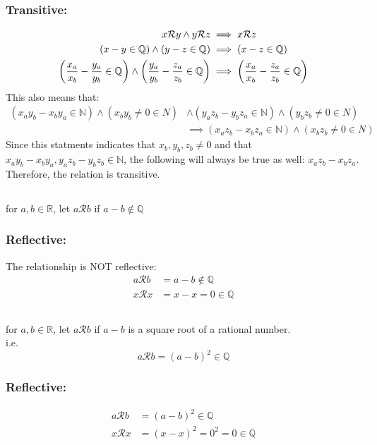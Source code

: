 \documentclass[]{article}
\newcommand{\Rel}{\mathcal{R}}
\newcommand{\R}{\mathbb{R}}
\newcommand{\N}{\mathbb{N}}
\newcommand{\Q}{\mathbb{Q}}
\begin{document}
\subsubsection{Transitive:}
\begin{align*}
	x \Rel y \land y \Rel z 
		&\implies x \Rel z\\
		\qty(x - y \in \Q) \land \qty(y - z \in \Q)
		&\implies \qty(x - z \in \Q)\\
	\qty(\frac{x_a}{x_b} - \frac{y_a}{y_b} \in \Q) \land \qty(\frac{y_a}{y_b} - \frac{z_a}{z_b} \in \Q)
		&\implies \qty(\frac{x_a}{x_b} - \frac{z_a}{z_b} \in \Q)
\end{align*}
This also means that:
\begin{align*}
	(x_a y_b - x_b y_a \in \N) \land (x_b y_b \neq 0 \in N)
		&\land (y_a z_b - y_b z_a \in \N) \land (y_b z_b \neq 0 \in N)\\
		&\implies (x_a z_b - x_b z_a \in \N) \land (x_b z_b \neq 0 \in N)
\end{align*}
Since this statments indicates that $x_b, y_b, z_b \neq 0$
and that $x_a y_b - x_b y_a, y_a z_b - y_b z_b \in \N$,
the following will always be true as well: $x_a z_b - x_b z_a$.
Therefore, the relation is transitive.


\subsection{}
for $a, b \in \R$,
let $a \Rel b$
if $a - b \notin \Q$

\subsubsection{Reflective:}
The relationship is NOT reflective:
\begin{align*}
	a \Rel b &= a - b \notin \Q\\
	x \Rel x 
		&= x - x = 0 \in \Q
\end{align*}

\newpage
\subsection{}
for $a, b \in \R$,
let $a \Rel b$
if $a - b$ is a square root of a rational number.\\
i.e.
$$a \Rel b = (a-b)^2 \in \Q$$

\subsubsection{Reflective:}
\begin{align*}
	a \Rel b &= (a-b)^2 \in \Q\\
	x \Rel x &= (x-x)^2 = 0^2 = 0 \in \Q
\end{align*}
\end{document}
